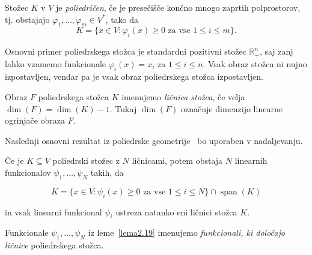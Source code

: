 \documentclass[mat2, tisk]{fmfdelo}
\newcommand{\R}{\mathbb{R}}
\begin{document}
\begin{definicija}
  Stožec $K$ v $V$ je \emph{poliedričen}, če je presečišče končno mnogo zaprtih polprostorov, tj. 
obstajajo $\varphi_1, \ldots, \varphi_m \in V^*$, tako da
\[K = \{ x \in V : \varphi_i(x) \ge 0 \text{ za vse } 1 \le i \le m \}.\]
\end{definicija}

Osnovni primer poliedrskega stožca je standardni pozitivni stožec $\R_+^n$, saj zanj 
lahko vzamemo funkcionale $\varphi_i(x) = x_i$ za $1 \le i \le n$.
Vsak obraz stožca ni nujno izpostavljen, vendar pa je vsak obraz poliedrskega stožca izpostavljen.

\begin{definicija}
  Obraz \( F \) poliedrskega stožca \( K \) imenujemo \emph{ličnica stožca}, 
če velja \( \dim(F) = \dim(K) - 1 \). Tukaj \( \dim(F) \) označuje dimenzijo 
linearne ogrinjače obraza \( F \).
\end{definicija} 
Naslednji osnovni rezultat iz poliedrske 
geometrije~\cite[Poglavje~8.4]{201} bo uporaben v nadaljevanju.

\begin{lema}\label{lema2.19}
Če je \( K \subseteq V \) poliedrski stožec z \( N \) ličnicami, potem obstaja 
\( N \) linearnih funkcionalov \( \psi_1, \ldots, \psi_N \) takih, da

\[ K = \{ x \in V : \psi_i(x) \ge 0 \text{ za vse } 1 \le i \le N \}
    \cap \operatorname{span}(K)\]

in vsak linearni funkcional \( \psi_i \) ustreza natanko eni ličnici stožca \( K \).
\end{lema}

Funkcionale \( \psi_1, \ldots, \psi_N \) iz leme~\ref{lema2.19}
imenujemo \emph{funkcionali, ki določajo ličnice}
poliedrskega stožca. 
\end{document}

